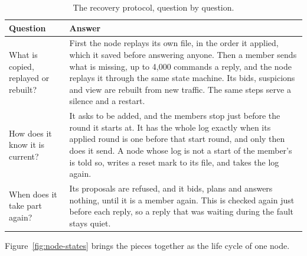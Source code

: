 \begin{table}[!htb]
\centering\small
\caption{The recovery protocol, question by question.}
\label{tab:recovery}
\begin{tabularx}{\linewidth}{@{}P{4.2cm}L@{}}
\toprule
Question & Answer \\
\midrule
What is copied, replayed or rebuilt? & First the node replays its own file, in the order it applied, which it saved before answering anyone. Then a member sends what is missing, up to 4,000 commands a reply, and the node replays it through the same state machine. Its bids, suspicions and view are rebuilt from new traffic. The same steps serve a silence and a restart. \\
How does it know it is current? & It asks to be added, and the members stop just before the round it starts at. It has the whole log exactly when its applied round is one before that start round, and only then does it send. A node whose log is not a start of the member's is told so, writes a reset mark to its file, and takes the log again. \\
When does it take part again? & Its proposals are refused, and it bids, plans and answers nothing, until it is a member again. This is checked again just before each reply, so a reply that was waiting during the fault stays quiet. \\
\bottomrule
\end{tabularx}
\end{table}

Figure~\ref{fig:node-states} brings the pieces together as the life cycle of one node.

